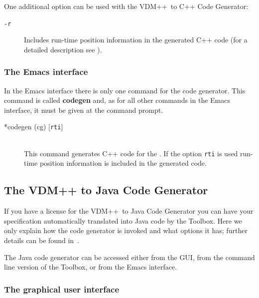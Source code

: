 \documentclass[\pformat,12pt]{article}
\newcommand{\vdmslpp}{VDM++}
\newcommand{\Toolbox}{Toolbox}
\begin{document}
One additional option can be used with the \vdmslpp\ to C++ Code
Generator:


\begin{description}
\item[{\tt -r}] Includes run-time position information in the
  generated C++ code (for a detailed description see
  ).
\end{description}

\subsubsection{The Emacs interface}

In the Emacs interface there is only one command for the code generator.
This command is called \textbf{codegen}
and, as for all other commands in the Emacs interface, it must be given at
the command prompt.

\begin{description}
\item[*codegen (cg)  {[}{\tt rti}{]}]   \mbox{}\\
  This command generates C++ code for the
  .
  If the option {\tt rti} is used run-time
  position information is included in the generated code.
\end{description}

\newpage
\subsection{The VDM++ to Java Code Generator}\label{sec:cgjava}

If you have a license  for the \vdmslpp\ to Java
Code Generator you can have your specification automatically 
translated into Java code by the \Toolbox. Here we only explain how the
code generator is invoked and what options it has; further details can
be found in~\cite{CGJavaManPP-SCSK}.

The Java code generator can be accessed either from the GUI, from the
command line version of the \Toolbox, or from the Emacs interface.


\subsubsection{The graphical user interface}
\end{document}
